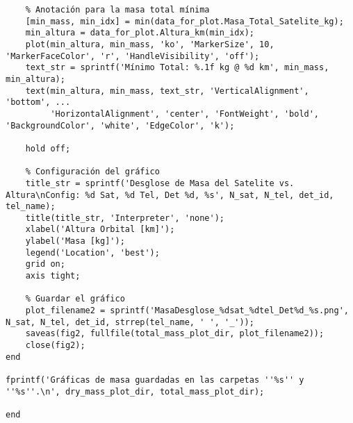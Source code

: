 \begin{verbatim}
    % Anotación para la masa total mínima
    [min_mass, min_idx] = min(data_for_plot.Masa_Total_Satelite_kg);
    min_altura = data_for_plot.Altura_km(min_idx);
    plot(min_altura, min_mass, 'ko', 'MarkerSize', 10, 'MarkerFaceColor', 'r', 'HandleVisibility', 'off');
    text_str = sprintf('Mínimo Total: %.1f kg @ %d km', min_mass, min_altura);
    text(min_altura, min_mass, text_str, 'VerticalAlignment', 'bottom', ...
         'HorizontalAlignment', 'center', 'FontWeight', 'bold', 'BackgroundColor', 'white', 'EdgeColor', 'k');
    
    hold off;
    
    % Configuración del gráfico
    title_str = sprintf('Desglose de Masa del Satelite vs. Altura\nConfig: %d Sat, %d Tel, Det %d, %s', N_sat, N_tel, det_id, tel_name);
    title(title_str, 'Interpreter', 'none');
    xlabel('Altura Orbital [km]');
    ylabel('Masa [kg]');
    legend('Location', 'best');
    grid on;
    axis tight;
    
    % Guardar el gráfico
    plot_filename2 = sprintf('MasaDesglose_%dsat_%dtel_Det%d_%s.png', N_sat, N_tel, det_id, strrep(tel_name, ' ', '_'));
    saveas(fig2, fullfile(total_mass_plot_dir, plot_filename2));
    close(fig2);
end

fprintf('Gráficas de masa guardadas en las carpetas ''%s'' y ''%s''.\n', dry_mass_plot_dir, total_mass_plot_dir);

end


\end{verbatim}
